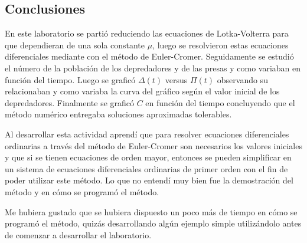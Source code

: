 \documentclass[../portafolio.tex]{subfiles}
\begin{document}
\subsection{Conclusiones}

En este laboratorio se partió reduciendo las ecuaciones de Lotka-Volterra para que dependieran de una sola constante $\mu$, luego se resolvieron estas ecuaciones diferenciales mediante con el método de Euler-Cromer. Seguidamente se estudió el número de la población de los depredadores y de las presas y como variaban en función del tiempo. Luego se graficó $\Delta(t)$ versus $\Pi(t)$  observando su relacionaban y como variaba la curva del gráfico según el valor inicial de los depredadores. Finalmente se graficó $C$ en función del tiempo concluyendo que el método numérico entregaba soluciones aproximadas tolerables.

\vspace{2mm}
Al desarrollar esta actividad aprendí que para resolver ecuaciones diferenciales ordinarias a través del método de Euler-Cromer son necesarios los valores iniciales y que si se tienen ecuaciones de orden mayor, entonces se pueden simplificar en un sistema de ecuaciones diferenciales ordinarias de primer orden con el fin de poder utilizar este método. Lo que no entendí muy bien fue la demostración del método y en cómo se programó el método.

\vspace{2mm}
Me hubiera gustado que se hubiera dispuesto un poco más de tiempo en cómo se programó el método, quizás desarrollando algún ejemplo simple utilizándolo antes de comenzar a desarrollar el laboratorio.
\end{document}
